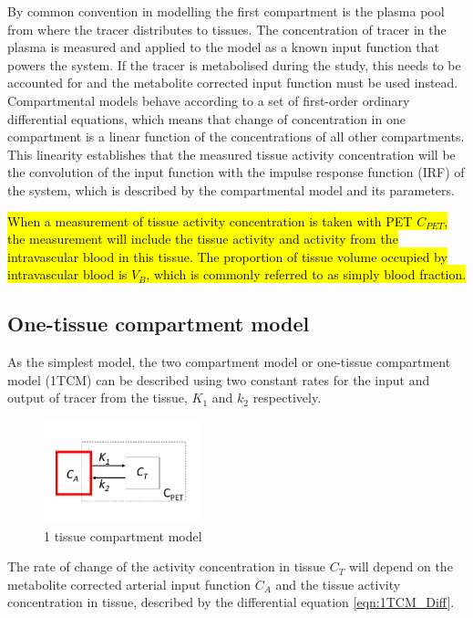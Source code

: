 By common convention in modelling the first compartment is the plasma pool from where the tracer distributes to tissues. The concentration of tracer in the plasma is measured and applied to the model as a known input function that powers the system. If the tracer is metabolised during the study, this needs to be accounted for and the metabolite corrected input function must be used instead. Compartmental models behave according to a set of first-order ordinary differential equations, which means that change of concentration in one compartment is a linear function of the concentrations of all other compartments. This linearity establishes that the measured tissue activity concentration will be the convolution of the input function with the impulse response function (IRF) of the system, which is described by the compartmental model and its parameters. \par
\hl{When a measurement of tissue activity concentration is taken with PET $C_{PET}$, the measurement will include the tissue activity and activity from the intravascular blood in this tissue. The proportion of tissue volume occupied by intravascular blood is $V_B$, which is commonly referred to as simply blood fraction.}\par

\subsection{One-tissue compartment model}
As the simplest model, the two compartment model or one-tissue compartment model (1TCM) can be described using two constant rates for the input and output of tracer from the tissue, $K_1$ and $k_2$ respectively.

\begin{figure}[ht]
	\includegraphics[width=0.4\textwidth]{figures/1_1_1TCM.pdf}
	\centering
	\caption{1 tissue compartment model}
	\centering
	\label{fig:1TCM}
\end{figure}

The rate of change of the activity concentration in tissue $C_T$ will depend on the metabolite corrected arterial input function $C_A$ and the tissue activity concentration in tissue, described by the differential equation \ref{eqn:1TCM_Diff}.


